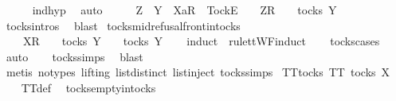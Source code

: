 \ \ \ \ \isamarkupfalse%
\ ind{\isacharunderscore}hyp\ \isamarkupfalse%
\ auto\isanewline
\ \ \isamarkupfalse%
\ \isamarkupfalse%
\ {\isachardoublequoteopen}Z\ {\isasymsubseteq}\ Y\ {\isasymLongrightarrow}\ {\isacharbrackleft}Xa{\isacharbrackright}\isactrlsub R\ {\isacharhash}\ {\isacharbrackleft}Tock{\isacharbrackright}\isactrlsub E\ {\isacharhash}\ {\isasymsigma}{\isacharprime}\ {\isacharat}\ {\isacharbrackleft}Z{\isacharbrackright}\isactrlsub R\ {\isacharhash}\ {\isasymsigma}\ {\isasymin}\ tocks\ Y{\isachardoublequoteclose}\isanewline
\ \ \ \ \isamarkupfalse%
\ tocks{\isachardot}intros\ \isamarkupfalse%
\ blast\isanewline
{}\isamarkupfalse%
%
\endisatagproof
{\isafoldproof}%
%
\isadelimproof
\isanewline
%
\endisadelimproof
\isanewline
{}\isamarkupfalse%
\ tocks{\isacharunderscore}mid{\isacharunderscore}refusal{\isacharunderscore}front{\isacharunderscore}in{\isacharunderscore}tocks{\isacharcolon}\isanewline
\ \ {\isachardoublequoteopen}{\isasymrho}\ {\isacharat}\ {\isacharbrackleft}X{\isacharbrackright}\isactrlsub R\ {\isacharhash}\ {\isasymsigma}\ {\isasymin}\ tocks\ Y\ {\isasymLongrightarrow}\ {\isasymrho}\ {\isasymin}\ tocks\ Y{\isachardoublequoteclose}\isanewline
%
\isadelimproof
\ \ %
\endisadelimproof
%
\isatagproof
{}\isamarkupfalse%
\ {\isacharparenleft}induct\ {\isasymrho}\ rule{\isacharcolon}ttWF{\isachardot}induct{\isacharparenright}\isanewline
\ \ \isamarkupfalse%
\ tocks{\isachardot}cases\ \isamarkupfalse%
\ auto\isanewline
\ \ \isamarkupfalse%
\ tocks{\isachardot}simps\ \isamarkupfalse%
\ blast\isanewline
\ \ \isamarkupfalse%
\ {\isacharparenleft}metis\ {\isacharparenleft}no{\isacharunderscore}types{\isacharcomma}\ lifting{\isacharparenright}\ list{\isachardot}distinct{\isacharparenleft}{}{\isacharparenright}\ list{\isachardot}inject\ tocks{\isachardot}simps{\isacharparenright}%
\endisatagproof
{\isafoldproof}%
%
\isadelimproof
\isanewline
%
\endisadelimproof
\isanewline
{}\isamarkupfalse%
\ TT{}{\isacharunderscore}tocks{\isacharcolon}\ {\isachardoublequoteopen}TT{}\ {\isacharparenleft}tocks\ X{\isacharparenright}{\isachardoublequoteclose}\isanewline
%
\isadelimproof
\ \ %
\endisadelimproof
%
\isatagproof
{}\isamarkupfalse%
\ TT{}{\isacharunderscore}def\ \isamarkupfalse%
\ tocks{\isachardot}empty{\isacharunderscore}in{\isacharunderscore}tocks\ \isamarkupfalse%
